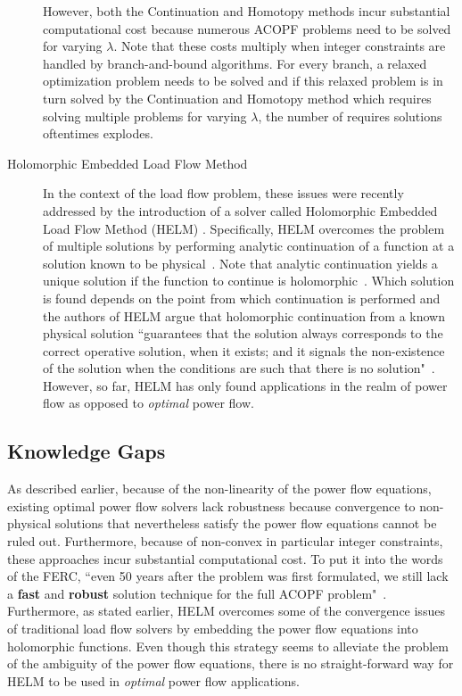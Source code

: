 \documentclass[11pt]{cmuthesis} %
\begin{document}
\begin{description}
However, both the Continuation and Homotopy methods incur substantial computational cost because numerous ACOPF problems need to be solved for varying $\lambda$. Note that these costs multiply when integer constraints are handled by branch-and-bound algorithms. For every branch, a relaxed optimization problem needs to be solved and if this relaxed problem is in turn solved by the Continuation and Homotopy method which requires solving multiple problems for varying $\lambda$, the number of requires solutions oftentimes explodes.
\item[Holomorphic Embedded Load Flow Method] In the context of the load flow problem, these issues were recently addressed by the introduction of a solver called Holomorphic Embedded Load Flow Method (HELM) \cite{trias2012holomorphic,trias2015fundamentals}. Specifically, HELM overcomes the problem of multiple solutions by performing analytic continuation of a function at a solution known to be physical~\cite{beach2000reliable}. Note that analytic continuation yields a unique solution if the function to continue is holomorphic~\cite{range2013holomorphic}. Which solution is found depends on the point from which continuation is performed and the authors of HELM argue that holomorphic continuation from a known physical solution ``guarantees that the solution always corresponds to the correct operative solution, when it exists; and it signals the non-existence of the solution when the conditions are such that there is no solution"~\cite{trias2012holomorphic}. However, so far, HELM has only found applications in the realm of power flow as opposed to \emph{optimal} power flow.
\end{description}

\subsection{Knowledge Gaps}

As described earlier, because of the non-linearity of the power flow equations, existing optimal power flow solvers lack robustness because convergence to non-physical solutions that nevertheless satisfy the power flow equations cannot be ruled out. Furthermore, because of non-convex in particular integer constraints, these approaches incur substantial computational cost. To put it into the words of the FERC, ``even 50 years after the problem was first formulated, we still lack a \textbf{fast} and \textbf{robust} solution technique for the full ACOPF problem"~\cite{cain2012history}.\\
Furthermore, as stated earlier, HELM overcomes some of the convergence issues of traditional load flow solvers by embedding the power flow equations into holomorphic functions. Even though this strategy seems to alleviate the problem of the ambiguity of the power flow equations, there is no straight-forward way for HELM to be used in \emph{optimal} power flow applications.
\end{document}
